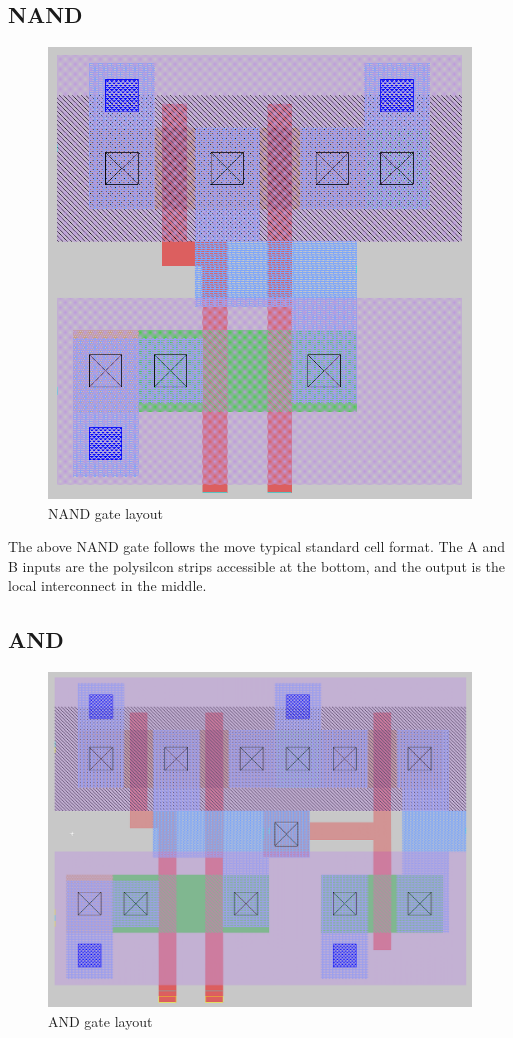 \documentclass[11pt]{article}
\begin{document}
\subsection*{NAND}
\begin{figure}[H]
  \centering
  \includegraphics[width=14cm]{media/nand_layout.png}
  \caption{NAND gate layout}
\end{figure}

The above NAND gate follows the move typical standard cell format. The A and B inputs are the polysilcon strips accessible at the bottom, and the output is the local interconnect in the middle.

\subsection*{AND}

\begin{figure}[H]
  \centering
  \includegraphics[width=\linewidth]{media/and_layout.png}
  \caption{AND gate layout}
\end{figure}
\end{document}
